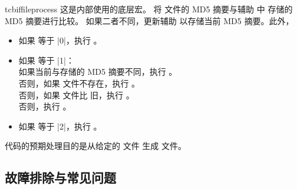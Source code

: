\begin{docCommand}[doc new=2016-07-14]{tcbiffileprocess}{}
  这是内部使用的底层宏。
 将 文件的 MD5 摘要与辅助 中
  存储的 MD5 摘要进行比较。
  如果二者不同，更新辅助 以存储当前 MD5 摘要。此外，
  \begin{itemize}
  \item 如果 等于 |0|，执行 。
  \item 如果 等于 |1|：\\
    如果当前与存储的 MD5 摘要不同，执行 。\\
    否则，如果 文件不存在，执行 。\\
    否则，如果 文件比 旧，执行 。\\
    否则，执行 。
  \item 如果 等于 |2|，执行 。
  \end{itemize}
  代码的预期处理目的是从给定的 文件
  生成 文件。
\end{docCommand}


\clearpage
\subsection{故障排除与常见问题}\label{subsec:external_troubleshooting}

